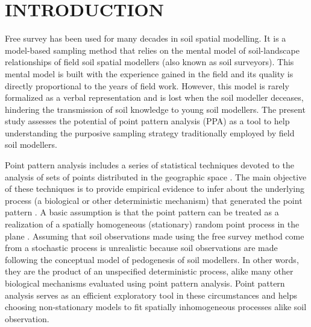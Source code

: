 \formatchapter

\section{INTRODUCTION}


Free survey has been used for many decades in soil spatial modelling. It is a model-based sampling method that 
relies on the mental model of soil-landscape relationships of field soil spatial modellers (also known as 
soil surveyors). This mental model is built with the experience gained in the field and its quality is 
directly 
proportional to the years of field work. However, this model is rarely formalized as a verbal representation 
and is lost when the soil modeller deceases, hindering the transmission of soil knowledge to young soil 
modellers. The present study assesses the potential of point pattern analysis (PPA) as a tool to help 
understanding the purposive sampling strategy traditionally employed by field soil modellers.

Point pattern analysis includes a series of statistical techniques devoted to the analysis of sets of points 
distributed in the geographic space \cite{Diggle2003}. The main objective of these 
techniques is to provide empirical evidence to infer about the underlying process (a biological or other 
deterministic
mechanism) that generated the point pattern \cite{BivandEtAl2008}. A basic assumption is that the point pattern
can be treated as a realization of a spatially homogeneous (stationary) random point process in the plane 
\cite{Diggle2003}. Assuming that soil observations made using the free survey method come from a stochastic 
process is unrealistic because soil observations are made following the conceptual model of pedogenesis of soil
modellers. In other words, they are the product of an unspecified deterministic process, alike many other 
biological mechanisms evaluated using point pattern analysis. Point pattern analysis serves as an efficient 
exploratory tool in these circumstances and helps choosing non-stationary models to fit spatially inhomogeneous
processes \cite{Baddeley2010} alike soil observation.

